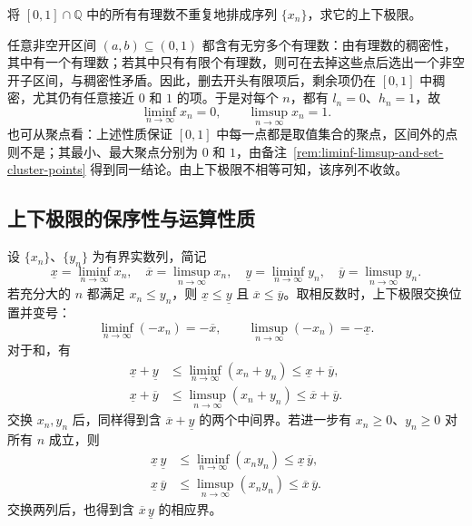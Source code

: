 \documentclass[UTF8,12pt,a4paper,fontset=fandol]{ctexbook}
\begin{document}
\begin{example}
将 $[0,1]\cap\mathbb{Q}$ 中的所有有理数不重复地排成序列 $\{x_n\}$，求它的上下极限。
\end{example}

\begin{solve}
任意非空开区间 $(a,b)\subseteq(0,1)$ 都含有无穷多个有理数：由有理数的稠密性，其中有一个有理数；若其中只有有限个有理数，则可在去掉这些点后选出一个非空开子区间，与稠密性矛盾。因此，删去开头有限项后，剩余项仍在 $[0,1]$ 中稠密，尤其仍有任意接近 $0$ 和 $1$ 的项。于是对每个 $n$，都有 $l_n=0$、$h_n=1$，故
\[
    \liminf_{n\to\infty}x_n=0,
    \qquad \limsup_{n\to\infty}x_n=1.
\]
也可从聚点看：上述性质保证 $[0,1]$ 中每一点都是取值集合的聚点，区间外的点则不是；其最小、最大聚点分别为 $0$ 和 $1$，由备注~\ref{rem:liminf-limsup-and-set-cluster-points} 得到同一结论。由上下极限不相等可知，该序列不收敛。
\end{solve}

\subsection{上下极限的保序性与运算性质}
\label{subsec:liminf-limsup-operations}

\begin{theorem}
\label{thm:liminf-limsup-operations}
设 $\{x_n\}$、$\{y_n\}$ 为有界实数列，简记
\[
    \underline x=\liminf_{n\to\infty}x_n,\quad
    \overline x=\limsup_{n\to\infty}x_n,\quad
    \underline y=\liminf_{n\to\infty}y_n,\quad
    \overline y=\limsup_{n\to\infty}y_n.
\]
若充分大的 $n$ 都满足 $x_n\leq y_n$，则 $\underline x\leq\underline y$ 且 $\overline x\leq\overline y$。取相反数时，上下极限交换位置并变号：
\begin{equation}
    \liminf_{n\to\infty}(-x_n)=-\overline x,
    \qquad \limsup_{n\to\infty}(-x_n)=-\underline x.
    \label{eq:liminf-limsup-negation}
\end{equation}
对于和，有
\begin{equation}
    \begin{aligned}
        \underline x+\underline y
        &\leq\liminf_{n\to\infty}(x_n+y_n)
        \leq\underline x+\overline y,\\
        \underline x+\overline y
        &\leq\limsup_{n\to\infty}(x_n+y_n)
        \leq\overline x+\overline y.
    \end{aligned}
    \label{eq:liminf-limsup-sum}
\end{equation}
交换 $x_n,y_n$ 后，同样得到含 $\overline x+\underline y$ 的两个中间界。若进一步有 $x_n\geq0$、$y_n\geq0$ 对所有 $n$ 成立，则
\begin{equation}
    \begin{aligned}
        \underline x\,\underline y
        &\leq\liminf_{n\to\infty}(x_ny_n)
        \leq\underline x\,\overline y,\\
        \underline x\,\overline y
        &\leq\limsup_{n\to\infty}(x_ny_n)
        \leq\overline x\,\overline y.
    \end{aligned}
    \label{eq:liminf-limsup-product}
\end{equation}
交换两列后，也得到含 $\overline x\,\underline y$ 的相应界。
\end{theorem}
\end{document}
